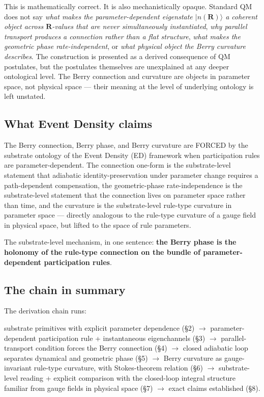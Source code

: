 \documentclass[11pt,a4paper]{article}
\begin{document}
This is mathematically correct. It is also mechanistically opaque. Standard QM does not say \emph{what makes the parameter-dependent eigenstate $|n(\mathbf{R})\rangle$ a coherent object across $\mathbf{R}$-values that are never simultaneously instantiated}, \emph{why parallel transport produces a connection rather than a flat structure}, \emph{what makes the geometric phase rate-independent}, or \emph{what physical object the Berry curvature describes}. The construction is presented as a derived consequence of QM postulates, but the postulates themselves are unexplained at any deeper ontological level. The Berry connection and curvature are objects in parameter space, not physical space --- their meaning at the level of underlying ontology is left unstated.

\subsection*{What Event Density claims}

The Berry connection, Berry phase, and Berry curvature are FORCED by the substrate ontology of the Event Density (ED) framework when participation rules are parameter-dependent. The connection one-form is the substrate-level statement that adiabatic identity-preservation under parameter change requires a path-dependent compensation, the geometric-phase rate-independence is the substrate-level statement that the connection lives on parameter space rather than time, and the curvature is the substrate-level rule-type curvature in parameter space --- directly analogous to the rule-type curvature of a gauge field in physical space, but lifted to the space of rule parameters.

The substrate-level mechanism, in one sentence: \textbf{the Berry phase is the holonomy of the rule-type connection on the bundle of parameter-dependent participation rules}.

\subsection*{The chain in summary}

The derivation chain runs:

substrate primitives with explicit parameter dependence (\S2) $\to$ parameter-dependent participation rule + instantaneous eigenchannels (\S3) $\to$ parallel-transport condition forces the Berry connection (\S4) $\to$ closed adiabatic loop separates dynamical and geometric phase (\S5) $\to$ Berry curvature as gauge-invariant rule-type curvature, with Stokes-theorem relation (\S6) $\to$ substrate-level reading + explicit comparison with the closed-loop integral structure familiar from gauge fields in physical space (\S7) $\to$ exact claims established (\S8).
\end{document}

